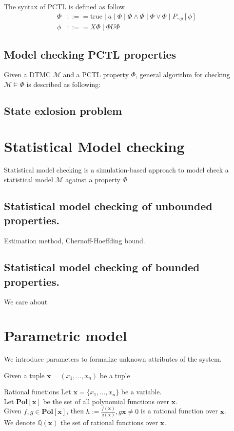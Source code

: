 \begin{definition} The syntax of PCTL is defined as follow
    \begin{align*}
        \Phi & ::== \text{true} \;|\; a \;|\; \Phi \;|\; \Phi \wedge \Phi \;|\; \Phi \vee \Phi \;|\;  P_{\sim  p}[\phi] \\
        \phi & ::== X\Phi \;|\; \Phi U \Phi
    \end{align*}
\end{definition}

\subsection{Model checking PCTL properties}
Given a DTMC $\mathcal{M}$ and a PCTL property $\Phi$, general algorithm for checking
$\mathcal{M}\models\Phi$ is described as following:

\subsection{State exlosion problem}


\section{Statistical Model checking}
Statistical model checking is a simulation-based approach to model check a statistical model
$\mathcal{M}$ against a property $\Phi$
\subsection{Statistical model checking of unbounded properties.}
Estimation method, Chernoff-Hoeffding bound.


\subsection{Statistical model checking of bounded properties.}
We care about

\section{Parametric model}
We introduce parameters to formalize unknown attributes of the system.
\begin{definition}
    Given a tuple $\mathbf{x}=(x_1,\ldots,x_n)$ be a tuple
\end{definition}

\begin{definition}{Rational functions}
    Let $\mathbf{x}=\{x_1,\ldots,x_n\}$ be a variable.\\
    Let $\mathbf{Pol}[\mathbf{x}]$ be the set of all polynomial functions over $\mathbf{x}$.\\
    Given $f,g\in\mathbf{Pol}[\mathbf{x}]$, then $h:=\frac{f(\mathbf{x})}{g(\mathbf{x})},
        g{\mathbf{x}}\neq 0$ is a rational function over $\mathbf{x}$.\\
    We denote $\mathbb{Q}(\mathbf{x})$ the set of rational functions over $\mathbf{x}$.
\end{definition}


